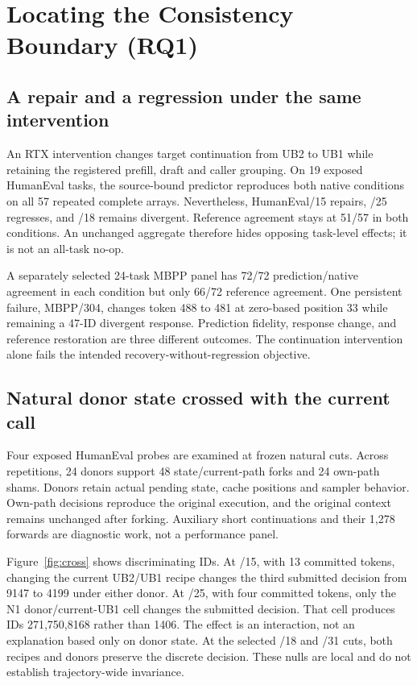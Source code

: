 \section{Locating the Consistency Boundary (RQ1)}
\label{sec:diagnosis}
\subsection{A repair and a regression under the same intervention}
An RTX intervention changes target continuation from UB2 to UB1 while retaining the registered prefill, draft and caller grouping. On 19 exposed HumanEval tasks, the source-bound predictor reproduces both native conditions on all 57 repeated complete arrays. Nevertheless, HumanEval/15 repairs, /25 regresses, and /18 remains divergent. Reference agreement stays at 51/57 in both conditions. An unchanged aggregate therefore hides opposing task-level effects; it is not an all-task no-op.

A separately selected 24-task MBPP panel has 72/72 prediction/native agreement in each condition but only 66/72 reference agreement. One persistent failure, MBPP/304, changes token 488 to 481 at zero-based position 33 while remaining a 47-ID divergent response. Prediction fidelity, response change, and reference restoration are three different outcomes. The continuation intervention alone fails the intended recovery-without-regression objective.

\subsection{Natural donor state crossed with the current call}
Four exposed HumanEval probes are examined at frozen natural cuts. Across repetitions, 24 donors support 48 state/current-path forks and 24 own-path shams. Donors retain actual pending state, cache positions and sampler behavior. Own-path decisions reproduce the original execution, and the original context remains unchanged after forking. Auxiliary short continuations and their 1,278 forwards are diagnostic work, not a performance panel.

Figure~\ref{fig:cross} shows discriminating IDs. At /15, with 13 committed tokens, changing the current UB2/UB1 recipe changes the third submitted decision from 9147 to 4199 under either donor. At /25, with four committed tokens, only the N1 donor/current-UB1 cell changes the submitted decision. That cell produces IDs 271,750,8168 rather than 1406. The effect is an interaction, not an explanation based only on donor state. At the selected /18 and /31 cuts, both recipes and donors preserve the discrete decision. These nulls are local and do not establish trajectory-wide invariance.

